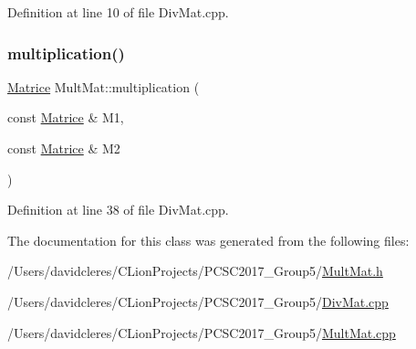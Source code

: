 Definition at line 10 of file Div\+Mat.\+cpp.

\mbox{\label{class_mult_mat_af4fd2724c38c3c8b97c228fee10375d5}} 
\subsubsection{\texorpdfstring{multiplication()}{multiplication()}}
{\footnotesize\ttfamily \mbox{\hyperlink{_div_mat_8h_a5cd1306cd22bb9a4a8d8b6ead3f49a08}{Matrice}} Mult\+Mat\+::multiplication (\begin{DoxyParamCaption}\item[{const \mbox{\hyperlink{_div_mat_8h_a5cd1306cd22bb9a4a8d8b6ead3f49a08}{Matrice}} \&}]{M1,  }\item[{const \mbox{\hyperlink{_div_mat_8h_a5cd1306cd22bb9a4a8d8b6ead3f49a08}{Matrice}} \&}]{M2 }\end{DoxyParamCaption})}



Definition at line 38 of file Div\+Mat.\+cpp.



The documentation for this class was generated from the following files\+:\begin{DoxyCompactItemize}
\item 
/\+Users/davidcleres/\+C\+Lion\+Projects/\+P\+C\+S\+C2017\+\_\+\+Group5/\mbox{\hyperlink{_mult_mat_8h}{Mult\+Mat.\+h}}\item 
/\+Users/davidcleres/\+C\+Lion\+Projects/\+P\+C\+S\+C2017\+\_\+\+Group5/\mbox{\hyperlink{_div_mat_8cpp}{Div\+Mat.\+cpp}}\item 
/\+Users/davidcleres/\+C\+Lion\+Projects/\+P\+C\+S\+C2017\+\_\+\+Group5/\mbox{\hyperlink{_mult_mat_8cpp}{Mult\+Mat.\+cpp}}\end{DoxyCompactItemize}
